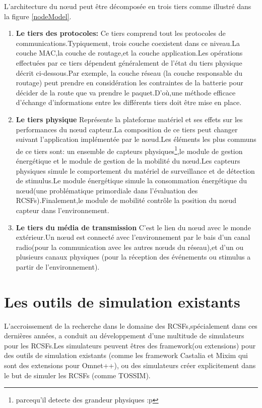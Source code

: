 L'architecture du nœud peut être décomposée en trois tiers comme illustré dans la figure \ref{nodeModel}.
\begin{enumerate}
\item \textbf{Le tiers des protocoles:} 
Ce tiers comprend tout les protocoles de communications.Typiquement,
trois couche coexistent dans ce niveau.La couche MAC,la couche de routage,et la couche application.Les opérations effectuées par ce tiers dépendent généralement de l'état du tiers physique décrit ci-dessous.Par exemple, la couche réseau (la couche responsable du routage) peut prendre en considération les contraintes de la batterie pour décider de la route que va prendre le paquet.D'où,une méthode efficace d'échange d'informations entre les différents tiers doit être mise en place. 
\item\textbf{Le tiers physique}
Représente la plateforme matériel et ses effets sur les performances du nœud capteur.La composition de ce tiers peut changer suivant l'application implémentée par le nœud.Les éléments les plus communs de ce tiers sont: un ensemble de capteurs physiques\footnote{parcequ'il detecte des grandeur physiques :p},le module de gestion énergétique et le module de gestion de la mobilité du nœud.Les capteurs physiques simule le comportement du matériel de surveillance et de détection de stimulus.Le module énergétique simule la consommation énergétique du nœud(une problématique primordiale dans l'évaluation des RCSFs).Finalement,le module de mobilité contrôle la position du nœud capteur dans l'environnement.
\item\textbf{Le tiers du média de transmission}
C'est le lien du nœud avec le monde extérieur.Un nœud est connecté avec l'environnement par le bais d'un canal radio(pour la communication avec les autres nœuds du réseau),et d'un ou plusieurs canaux physiques (pour la réception des événements ou stimulus a partir de l'environnement).
\end{enumerate}


\section{Les outils de simulation existants}

L'accroissement de la recherche dans le domaine des RCSFs,spécialement dans ces dernières années, a conduit au développement d'une multitude de simulateurs pour les RCSFs.Les simulateurs peuvent êtres des framework(ou extensions) pour des outils de simulation existants (comme les framework Castalia et Mixim qui sont des extensions pour Omnet++), ou des simulateurs créer explicitement dans le but de simuler les RCSFs (comme TOSSIM).


